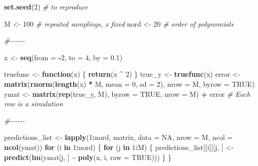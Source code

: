 \documentclass[
]{article}
\newenvironment{Shaded}{\begin{snugshade}}{\end{snugshade}}
\newcommand{\AttributeTok}[1]{\textcolor[rgb]{0.13,0.29,0.53}{#1}}
\newcommand{\CommentTok}[1]{\textcolor[rgb]{0.56,0.35,0.01}{\textit{#1}}}
\newcommand{\ConstantTok}[1]{\textcolor[rgb]{0.56,0.35,0.01}{#1}}
\newcommand{\ControlFlowTok}[1]{\textcolor[rgb]{0.13,0.29,0.53}{\textbf{#1}}}
\newcommand{\DecValTok}[1]{\textcolor[rgb]{0.00,0.00,0.81}{#1}}
\newcommand{\FloatTok}[1]{\textcolor[rgb]{0.00,0.00,0.81}{#1}}
\newcommand{\FunctionTok}[1]{\textcolor[rgb]{0.13,0.29,0.53}{\textbf{#1}}}
\newcommand{\NormalTok}[1]{#1}
\newcommand{\OtherTok}[1]{\textcolor[rgb]{0.56,0.35,0.01}{#1}}
\newcommand{\SpecialCharTok}[1]{\textcolor[rgb]{0.81,0.36,0.00}{\textbf{#1}}}
\begin{document}
\begin{Shaded}
\begin{Highlighting}[]
\FunctionTok{set.seed}\NormalTok{(}\DecValTok{2}\NormalTok{) }\CommentTok{\# to reproduce}

\NormalTok{M }\OtherTok{\textless{}{-}} \DecValTok{100} \CommentTok{\# repeated samplings, x fixed}
\NormalTok{nord }\OtherTok{\textless{}{-}} \DecValTok{20} \CommentTok{\# order of polynomials}

\CommentTok{\#{-}{-}{-}{-}{-}{-}}

\NormalTok{x }\OtherTok{\textless{}{-}} \FunctionTok{seq}\NormalTok{(}\AttributeTok{from =} \SpecialCharTok{{-}}\DecValTok{2}\NormalTok{, }\AttributeTok{to =} \DecValTok{4}\NormalTok{, }\AttributeTok{by =} \FloatTok{0.1}\NormalTok{)}

\NormalTok{truefunc }\OtherTok{\textless{}{-}} \ControlFlowTok{function}\NormalTok{(x) \{}
  \FunctionTok{return}\NormalTok{(x }\SpecialCharTok{\^{}} \DecValTok{2}\NormalTok{)}
\NormalTok{\}}
\NormalTok{true\_y }\OtherTok{\textless{}{-}} \FunctionTok{truefunc}\NormalTok{(x)}
\NormalTok{error }\OtherTok{\textless{}{-}} \FunctionTok{matrix}\NormalTok{(}\FunctionTok{rnorm}\NormalTok{(}\FunctionTok{length}\NormalTok{(x) }\SpecialCharTok{*}\NormalTok{ M, }\AttributeTok{mean =} \DecValTok{0}\NormalTok{, }\AttributeTok{sd =} \DecValTok{2}\NormalTok{),}
                \AttributeTok{nrow =}\NormalTok{ M,}
                \AttributeTok{byrow =} \ConstantTok{TRUE}\NormalTok{)}
\NormalTok{ymat }\OtherTok{\textless{}{-}} \FunctionTok{matrix}\NormalTok{(}\FunctionTok{rep}\NormalTok{(true\_y, M), }\AttributeTok{byrow =} \ConstantTok{TRUE}\NormalTok{, }\AttributeTok{nrow =}\NormalTok{ M) }\SpecialCharTok{+}\NormalTok{ error  }\CommentTok{\# Each row is a simulation}

\CommentTok{\#{-}{-}{-}{-}{-}{-}}

\NormalTok{predictions\_list }\OtherTok{\textless{}{-}} \FunctionTok{lapply}\NormalTok{(}\DecValTok{1}\SpecialCharTok{:}\NormalTok{nord, matrix, }\AttributeTok{data =} \ConstantTok{NA}\NormalTok{, }\AttributeTok{nrow =}\NormalTok{ M, }\AttributeTok{ncol =} \FunctionTok{ncol}\NormalTok{(ymat))}
\ControlFlowTok{for}\NormalTok{ (i }\ControlFlowTok{in} \DecValTok{1}\SpecialCharTok{:}\NormalTok{nord) \{}
  \ControlFlowTok{for}\NormalTok{ (j }\ControlFlowTok{in} \DecValTok{1}\SpecialCharTok{:}\NormalTok{M) \{}
\NormalTok{    predictions\_list[[i]][j, ] }\OtherTok{\textless{}{-}} \FunctionTok{predict}\NormalTok{(}\FunctionTok{lm}\NormalTok{(ymat[j, ] }\SpecialCharTok{\textasciitilde{}} \FunctionTok{poly}\NormalTok{(x, i, }\AttributeTok{raw =} \ConstantTok{TRUE}\NormalTok{)))}
\NormalTok{  \}}
\NormalTok{\}}


\end{Highlighting}
\end{Shaded}
\end{document}
